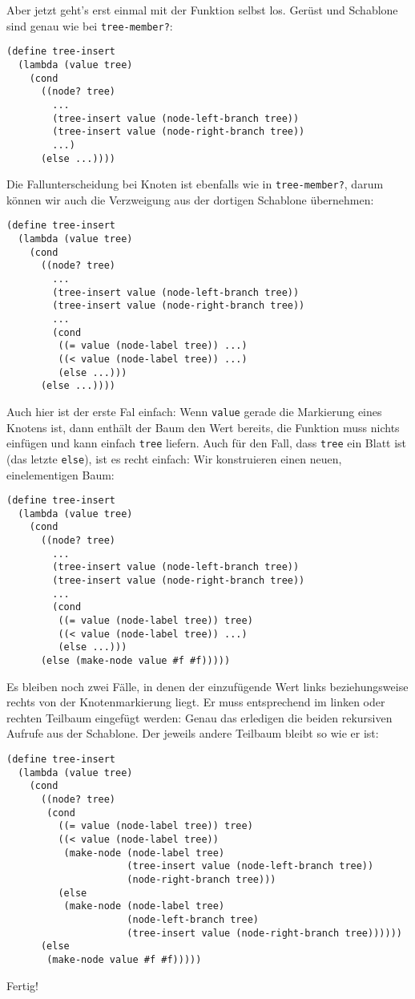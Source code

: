 Aber jetzt geht's erst einmal mit der Funktion selbst los.  Gerüst und
Schablone sind genau wie bei \lstinline{tree-member?}:
%
\begin{lstlisting}
(define tree-insert
  (lambda (value tree)
    (cond
      ((node? tree)
        ...
        (tree-insert value (node-left-branch tree))
        (tree-insert value (node-right-branch tree))
        ...)
      (else ...))))
\end{lstlisting}
%
Die Fallunterscheidung bei Knoten ist ebenfalls wie in
\lstinline{tree-member?}, darum können wir auch die Verzweigung aus
der dortigen Schablone übernehmen:
%
\begin{lstlisting}
(define tree-insert
  (lambda (value tree)
    (cond
      ((node? tree)
        ...
        (tree-insert value (node-left-branch tree))
        (tree-insert value (node-right-branch tree))
        ...
        (cond
         ((= value (node-label tree)) ...)
         ((< value (node-label tree)) ...)
         (else ...)))
      (else ...))))
\end{lstlisting}
%
Auch hier ist der erste Fal einfach: Wenn \lstinline{value} gerade die
Markierung eines Knotens ist, dann enthält der Baum den Wert bereits,
die Funktion muss nichts einfügen und kann einfach \lstinline{tree}
liefern.  Auch für den Fall, dass \lstinline{tree} ein Blatt ist (das
letzte \lstinline{else}), ist es recht einfach: Wir konstruieren einen
neuen, einelementigen Baum:
%
\begin{lstlisting}
(define tree-insert
  (lambda (value tree)
    (cond
      ((node? tree)
        ...
        (tree-insert value (node-left-branch tree))
        (tree-insert value (node-right-branch tree))
        ...
        (cond
         ((= value (node-label tree)) tree)
         ((< value (node-label tree)) ...)
         (else ...)))
      (else (make-node value #f #f)))))
\end{lstlisting}
%
Es bleiben noch zwei Fälle, in denen der einzufügende Wert links
beziehungsweise rechts von der Knotenmarkierung liegt.  Er muss
entsprechend im linken oder rechten Teilbaum eingefügt werden: Genau
das erledigen die beiden rekursiven Aufrufe aus der Schablone.  Der
jeweils andere Teilbaum bleibt so wie er ist:
%
\begin{lstlisting}
(define tree-insert
  (lambda (value tree)
    (cond
      ((node? tree)
       (cond
         ((= value (node-label tree)) tree)
         ((< value (node-label tree))
          (make-node (node-label tree)
                     (tree-insert value (node-left-branch tree))
                     (node-right-branch tree)))
         (else
          (make-node (node-label tree)
                     (node-left-branch tree)
                     (tree-insert value (node-right-branch tree))))))
      (else
       (make-node value #f #f)))))
\end{lstlisting}
%
Fertig!

